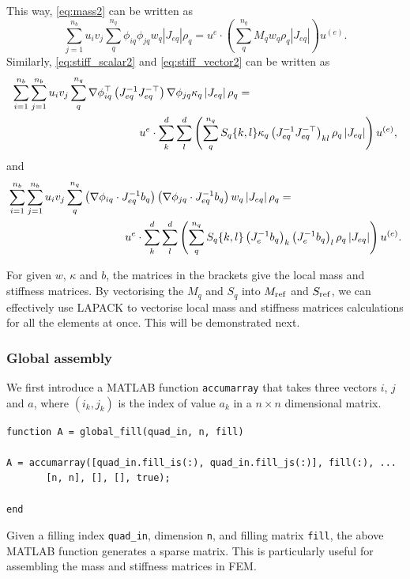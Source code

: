 \documentclass[a4paper,11pt]{scrartcl}
\newcommand{\eq}[1]{\begin{equation} #1 \end{equation}}
\newcommand{\eqs}[1]{\begin{align} #1 \end{align}}
\begin{document}

This way, \eqref{eq:mass2} can be written as
\eq{\sum_{j=1}^{n_b} u_i v_j \sum_{q}^{n_q} \phi_{iq} \phi_{jq} w_q \left|J_{eq}\right|\rho_q =
%
 u^{e} \cdot \left(\sum_{q}^{n_q} M_q w_q \rho_q \left|J_{eq}\right|  \right) u^{(e)}.
}
Similarly, \eqref{eq:stiff_scalar2} and \eqref{eq:stiff_vector2} can be written as
\eqs{
\sum_{i=1}^{n_b} \sum_{j=1}^{n_b} u_i v_j \sum_{q}^{n_q} \nabla \phi_{iq} ^\top \left( J_{eq}^{-1} J_{eq}^{-\top} \right) \nabla \phi_{jq} \kappa_q \left|J_{eq}\right|\rho_q = \hspace{-10em}& \nonumber\\
%
 & u^{e} \cdot  \sum_k^{d} \sum_l^{d} \left(  \sum_{q}^{n_q}  S_q\{k,l\} \kappa_q \left( J_{eq}^{-1} J_{eq}^{-\top} \right)_{kl}  \rho_q \left|J_{eq}\right|  \right) u^{(e)},
}
and
\eqs{
\sum_{i=1}^{n_b} \sum_{j=1}^{n_b} u_i v_j \sum_{q}^{n_q}\left( \nabla \phi_{iq} \cdot J_{eq}^{-1} b_q \right) \left( \nabla \phi_{jq} \cdot J_{eq}^{-1} b_q \right) w_q \left|J_{eq}\right|\rho_q = \hspace{-15em}& \nonumber\\
%
& u^{e} \cdot  \sum_k^{d} \sum_l^{d} \left( \sum_{q}^{n_q}  S_q\{k,l\} \left(J_{e}^{-1} b_q\right)_k \left(J_{e}^{-1} b_q\right)_l \rho_q \left|J_{eq}\right| \right)  u^{(e)}.
}

For given $w$, $\kappa$ and $b$, the matrices in the brackets give the local mass and stiffness matrices. By vectorising the $M_q$ and $S_q$ into $M_{\rm ref}$ and $S_{\rm ref}$, we can effectively  use LAPACK to vectorise local mass and stiffness matrices calculations for all the elements at once. This will be demonstrated next.


\subsubsection*{Global assembly}

We first introduce a MATLAB function \verb|accumarray| that takes three vectors $i$, $j$ and $a$, where $(i_k, j_k)$ is the index of value $a_k$ in a $n \times n$ dimensional matrix.
%
\begin{verbatim}
function A = global_fill(quad_in, n, fill)

A = accumarray([quad_in.fill_is(:), quad_in.fill_js(:)], fill(:), ...
       [n, n], [], [], true);

end
\end{verbatim}
%
Given a filling index \verb|quad_in|, dimension \verb|n|, and filling matrix \verb|fill|, the above MATLAB function generates a sparse matrix. This is particularly useful for assembling the mass and stiffness matrices in FEM.
\end{document}
